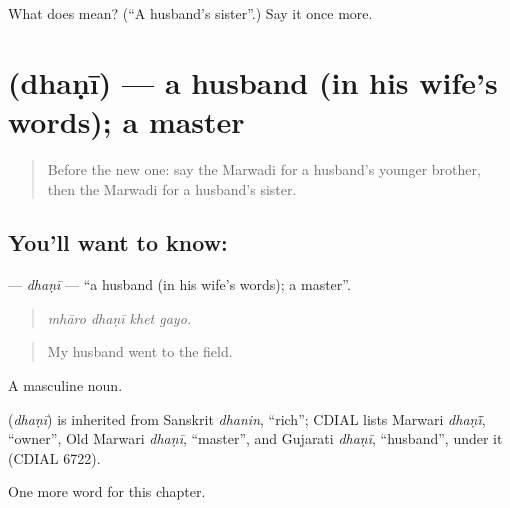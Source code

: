 \begin{tcolorbox}[breakable,colback=teal!4,colframe=teal!35!black,title={Before you move on}]
What does  mean? (\textquotedblleft{}A husband's sister\textquotedblright{}.) Say it once more.
\end{tcolorbox}
\section[\texorpdfstring{\mw{धणी} (dhaṇī)}{धणी (dhaṇī)}]{ (dhaṇī) — a husband (in his wife's words); a master}

\label{lesson:MW-C259-dhani}



\begin{quote}
Before the new one: say the Marwadi for a husband's younger brother, then the Marwadi for a husband's sister.
\end{quote}

\subsection*{You'll want to know: }
\textbf{} — \emph{dhaṇī} — \textquotedblleft{}a husband (in his wife's words); a master\textquotedblright{}.

\begin{quote}
   
\end{quote}

\begin{quote}
\emph{mhāro dhaṇī khet gayo.}
\end{quote}

\begin{quote}
My husband went to the field.
\end{quote}

A masculine noun.

\begin{cousinweb}
\textbf{} (\emph{dhaṇī}) is inherited from Sanskrit \emph{dhanin}, \textquotedblleft{}rich\textquotedblright{}; CDIAL lists Marwari \emph{dhaṇī̃}, \textquotedblleft{}owner\textquotedblright{}, Old Marwari \emph{dhaṇī}, \textquotedblleft{}master\textquotedblright{}, and Gujarati \emph{dhaṇī}, \textquotedblleft{}husband\textquotedblright{}, under it (CDIAL 6722).
\end{cousinweb}

\begin{grammarlens}[title={What you've built}]
One more word for this chapter.
\end{grammarlens}

